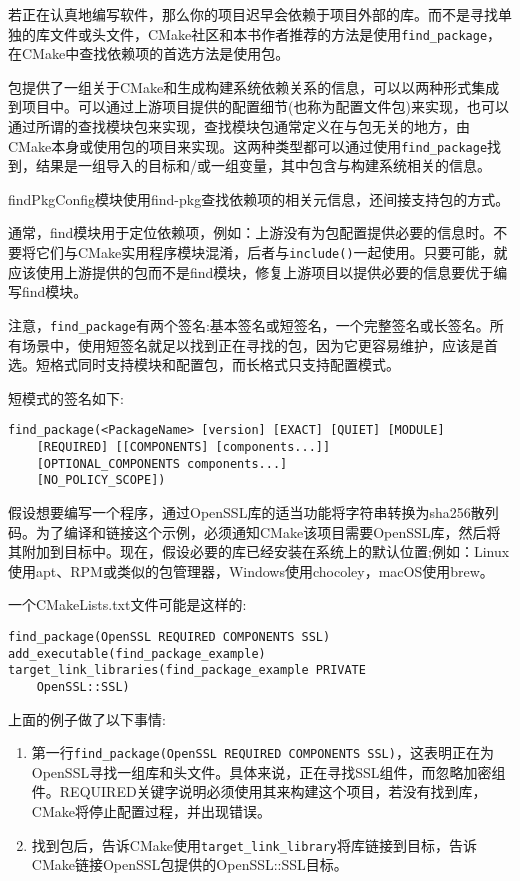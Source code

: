 
若正在认真地编写软件，那么你的项目迟早会依赖于项目外部的库。而不是寻找单独的库文件或头文件，CMake社区和本书作者推荐的方法是使用\texttt{find\_package}，在CMake中查找依赖项的首选方法是使用包。

包提供了一组关于CMake和生成构建系统依赖关系的信息，可以以两种形式集成到项目中。可以通过上游项目提供的配置细节(也称为配置文件包)来实现，也可以通过所谓的查找模块包来实现，查找模块包通常定义在与包无关的地方，由CMake本身或使用包的项目来实现。这两种类型都可以通过使用\texttt{find\_package}找到，结果是一组导入的目标和/或一组变量，其中包含与构建系统相关的信息。

findPkgConfig模块使用find-pkg查找依赖项的相关元信息，还间接支持包的方式。

通常，find模块用于定位依赖项，例如：上游没有为包配置提供必要的信息时。不要将它们与CMake实用程序模块混淆，后者与\texttt{include()}一起使用。只要可能，就应该使用上游提供的包而不是find模块，修复上游项目以提供必要的信息要优于编写find模块。

注意，\texttt{find\_package}有两个签名:基本签名或短签名，一个完整签名或长签名。所有场景中，使用短签名就足以找到正在寻找的包，因为它更容易维护，应该是首选。短格式同时支持模块和配置包，而长格式只支持配置模式。

短模式的签名如下:

\begin{lstlisting}[style=styleCMake]
find_package(<PackageName> [version] [EXACT] [QUIET] [MODULE]
	[REQUIRED] [[COMPONENTS] [components...]]
	[OPTIONAL_COMPONENTS components...]
	[NO_POLICY_SCOPE])
\end{lstlisting}

假设想要编写一个程序，通过OpenSSL库的适当功能将字符串转换为sha256散列码。为了编译和链接这个示例，必须通知CMake该项目需要OpenSSL库，然后将其附加到目标中。现在，假设必要的库已经安装在系统上的默认位置;例如：Linux使用apt、RPM或类似的包管理器，Windows使用chocoley，macOS使用brew。

一个CMakeLists.txt文件可能是这样的:

\begin{lstlisting}[style=styleCMake]
find_package(OpenSSL REQUIRED COMPONENTS SSL)
add_executable(find_package_example)
target_link_libraries(find_package_example PRIVATE
	OpenSSL::SSL)
\end{lstlisting}

上面的例子做了以下事情:

\begin{enumerate}
\item 
第一行\texttt{find\_package(OpenSSL REQUIRED COMPONENTS SSL)}，这表明正在为OpenSSL寻找一组库和头文件。具体来说，正在寻找SSL组件，而忽略加密组件。REQUIRED关键字说明必须使用其来构建这个项目，若没有找到库，CMake将停止配置过程，并出现错误。

\item 
找到包后，告诉CMake使用\texttt{target\_link\_library}将库链接到目标，告诉CMake链接OpenSSL包提供的OpenSSL::SSL目标。
\end{enumerate}

